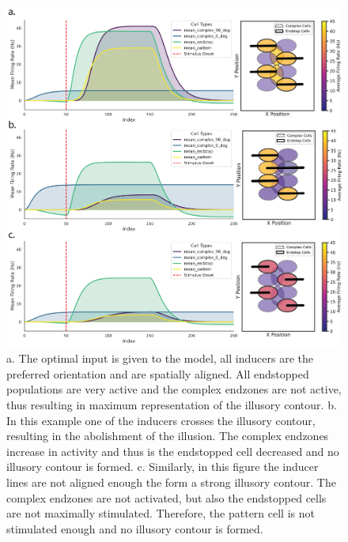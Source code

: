 \documentclass[12pt]{article}
\begin{document}
\begin{figure}[H]
  \centering
  \includegraphics[width=1.0 \textwidth]{figures/Figure_Population_configs.png}
  \caption{a. The optimal input is given to the model, all inducers are the preferred orientation and are spatially aligned. All endstopped populations are very active and the complex endzones are not active, thus resulting in maximum representation of the illusory contour. b. In this example one of the inducers crosses the illusory contour, resulting in the abolishment of the illusion. The complex endzones increase in activity and thus is the endstopped cell decreased and no illusory contour is formed. c. Similarly, in this figure the inducer lines are not aligned enough the form a strong illusory contour. The complex endzones are not activated, but also the endstopped cells are not maximally stimulated. Therefore, the pattern cell is not stimulated enough and no illusory contour is formed.}
  \label{fig:population_contours}
\end{figure}



\newpage
\end{document}
